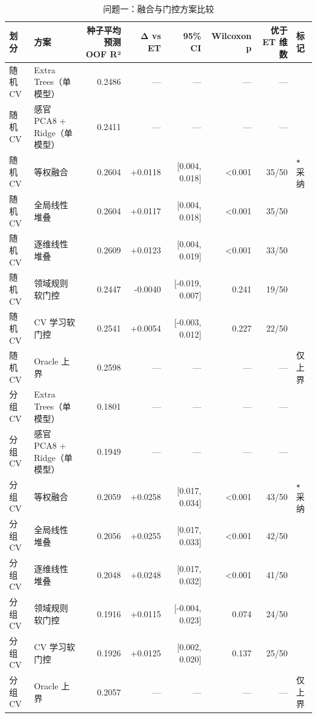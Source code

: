 \begin{table}[tbp]
\centering
\caption{问题一：融合与门控方案比较}
\label{tab:t03_q1_fusion}
\footnotesize
\setlength{\tabcolsep}{3.5pt}
\begin{tabular}{llrrrrrl}
\toprule
划分 & 方案 & 种子平均预测 OOF R² & Δ vs ET & 95\% CI & Wilcoxon p & 优于 ET 维数 & 标记 \\
\midrule
随机 CV & Extra Trees（单模型） & 0.2486 & — & — & — & — &  \\
随机 CV & 感官 PCA8 + Ridge（单模型） & 0.2411 & — & — & — & — &  \\
随机 CV & 等权融合 & 0.2604 & +0.0118 & [0.004, 0.018] & <0.001 & 35/50 & $\star$ 采纳 \\
随机 CV & 全局线性堆叠 & 0.2604 & +0.0117 & [0.004, 0.018] & <0.001 & 35/50 &  \\
随机 CV & 逐维线性堆叠 & 0.2609 & +0.0123 & [0.004, 0.019] & <0.001 & 33/50 &  \\
随机 CV & 领域规则软门控 & 0.2447 & -0.0040 & [-0.019, 0.007] & 0.241 & 19/50 &  \\
随机 CV & CV 学习软门控 & 0.2541 & +0.0054 & [-0.003, 0.012] & 0.227 & 22/50 &  \\
随机 CV & Oracle 上界 & 0.2598 & — & — & — & — & 仅上界 \\
分组 CV & Extra Trees（单模型） & 0.1801 & — & — & — & — &  \\
分组 CV & 感官 PCA8 + Ridge（单模型） & 0.1949 & — & — & — & — &  \\
分组 CV & 等权融合 & 0.2059 & +0.0258 & [0.017, 0.034] & <0.001 & 43/50 & $\star$ 采纳 \\
分组 CV & 全局线性堆叠 & 0.2056 & +0.0255 & [0.017, 0.033] & <0.001 & 42/50 &  \\
分组 CV & 逐维线性堆叠 & 0.2048 & +0.0248 & [0.017, 0.032] & <0.001 & 41/50 &  \\
分组 CV & 领域规则软门控 & 0.1916 & +0.0115 & [-0.004, 0.023] & 0.074 & 24/50 &  \\
分组 CV & CV 学习软门控 & 0.1926 & +0.0125 & [0.002, 0.020] & 0.137 & 25/50 &  \\
分组 CV & Oracle 上界 & 0.2057 & — & — & — & — & 仅上界 \\
\bottomrule
\end{tabular}
\end{table}
